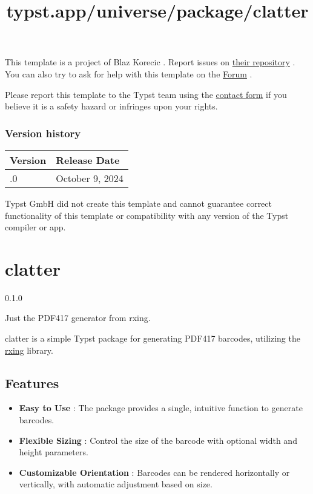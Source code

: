 This template is a project of Blaz Korecic . Report issues on
\href{https://github.com/bkorecic/enunciado-facil-fcfm}{their
repository} . You can also try to ask for help with this template on the
\href{https://forum.typst.app}{Forum} .

Please report this template to the Typst team using the
\href{https://typst.app/contact}{contact form} if you believe it is a
safety hazard or infringes upon your rights.

\label{versions}
\subsubsection{Version history}\label{version-history}

\begin{longtable}[]{@{}ll@{}}
\toprule\noalign{}
Version & Release Date \\
\midrule\noalign{}
\endhead
\bottomrule\noalign{}
\endlastfoot
0.1.0 & October 9, 2024 \\
\end{longtable}

Typst GmbH did not create this template and cannot guarantee correct
functionality of this template or compatibility with any version of the
Typst compiler or app.


\title{typst.app/universe/package/clatter}

\label{banner}
\section{clatter}\label{clatter}

{ 0.1.0 }

Just the PDF417 generator from rxing.

\label{readme}
clatter is a simple Typst package for generating PDF417 barcodes,
utilizing the \href{https://github.com/rxing-core/rxing}{rxing} library.

\subsection{Features}\label{features}

\begin{itemize}
\tightlist
\item
  \textbf{Easy to Use} : The package provides a single, intuitive
  function to generate barcodes.
\item
  \textbf{Flexible Sizing} : Control the size of the barcode with
  optional width and height parameters.
\item
  \textbf{Customizable Orientation} : Barcodes can be rendered
  horizontally or vertically, with automatic adjustment based on size.
\end{itemize}

